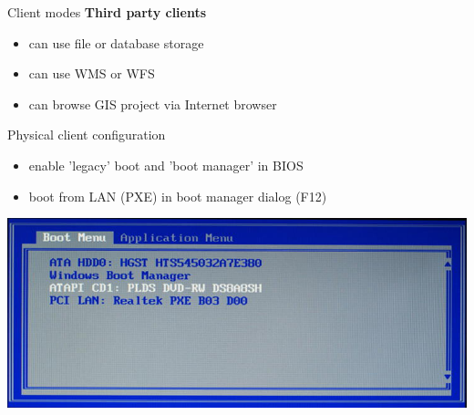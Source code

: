 \documentclass[12pt]{beamer}
\begin{document}
\begin{frame}{Client modes}
	\textbf{Third party clients}
	\begin{itemize}
		\item can use file or database storage
		\item can use WMS or WFS 
		\item can browse GIS project via Internet browser
	\end{itemize}
\end{frame}


\begin{frame}{Physical client configuration}
	\begin{itemize}
		\item enable 'legacy' boot and 'boot manager' in BIOS
		\item boot from LAN (PXE) in boot manager dialog (F12)
	\end{itemize}
	\begin{center}
		\includegraphics[keepaspectratio=true,height=0.6\textheight]{images/real-world-example/client-physical-configuration.png}
	\end{center}
\end{frame}
\end{document}
